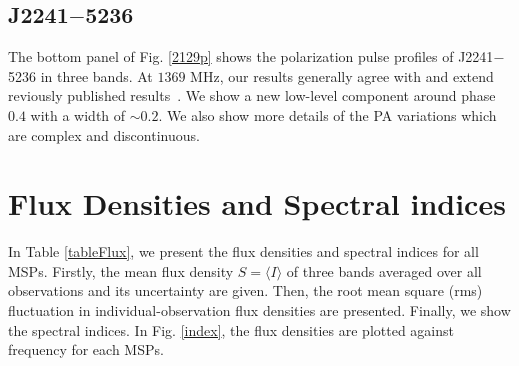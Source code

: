 \documentclass[useAMS,usenatbib]{mn2e}
\begin{document}

\subsection{J2241$-$5236}

The bottom panel of Fig. \ref{2129p} shows the polarization pulse profiles of 
J2241$-$5236 
in three bands.
%
At $1369$ MHz, our results generally agree with and extend reviously published results~\citep{Keith11}.
%
We show a new low-level component around phase $0.4$ with a width of $\sim 0.2$.
%
We also show more details of the PA variations which are complex and discontinuous.
%



\section{Flux Densities and Spectral indices}

In Table \ref{tableFlux}, we present the flux densities and spectral indices 
for all MSPs.
%
Firstly, the mean flux density $S=\langle I\rangle$ of three bands averaged over all 
observations and its uncertainty are given. 
%
Then, the root mean square (rms) fluctuation in individual-observation flux 
densities are presented. Finally, we show the spectral indices.
%
In Fig. \ref{index}, the flux densities are plotted against frequency for each 
MSPs.
%
\end{document}
